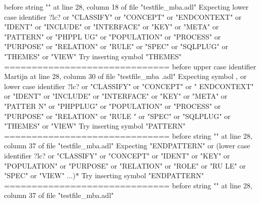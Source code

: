 {  before string "" at line 28, column 18 of file "testfile\_mba.adl"\newline
  Expecting lower case identifier ?lc? or "CLASSIFY" or "CONCEPT" or "ENDCONTEXT"\newline
  or "IDENT" or "INCLUDE" or "INTERFACE" or "KEY" or "META" or "PATTERN" or "PHPPL\newline
  UG" or "POPULATION" or "PROCESS" or "PURPOSE" or "RELATION" or "RULE" or "SPEC"\newline
  or "SQLPLUG" or "THEMES" or "VIEW"\newline
  Try inserting symbol "THEMES"\newline
  \newline
  ==============================\newline
  \newline
  before upper case identifier Martijn at line 28, column 30 of file "testfile\_mba\newline
  .adl"\newline
  Expecting symbol , or lower case identifier ?lc? or "CLASSIFY" or "CONCEPT" or "\newline
  ENDCONTEXT" or "IDENT" or "INCLUDE" or "INTERFACE" or "KEY" or "META" or "PATTER\newline
  N" or "PHPPLUG" or "POPULATION" or "PROCESS" or "PURPOSE" or "RELATION" or "RULE\newline
  " or "SPEC" or "SQLPLUG" or "THEMES" or "VIEW"\newline
  Try inserting symbol "PATTERN"\newline
  \newline
  ==============================\newline
  \newline
  before string "" at line 28, column 37 of file "testfile\_mba.adl"\newline
  Expecting "ENDPATTERN" or (lower case identifier ?lc? or "CLASSIFY" or "CONCEPT"\newline
   or "IDENT" or "KEY" or "POPULATION" or "PURPOSE" or "RELATION" or "ROLE" or "RU\newline
  LE" or "SPEC" or "VIEW" ...)*\newline
  Try inserting symbol "ENDPATTERN"\newline
  \newline
  ==============================\newline
  \newline
  before string "" at line 28, column 37 of file "testfile\_mba.adl"\newline
}

